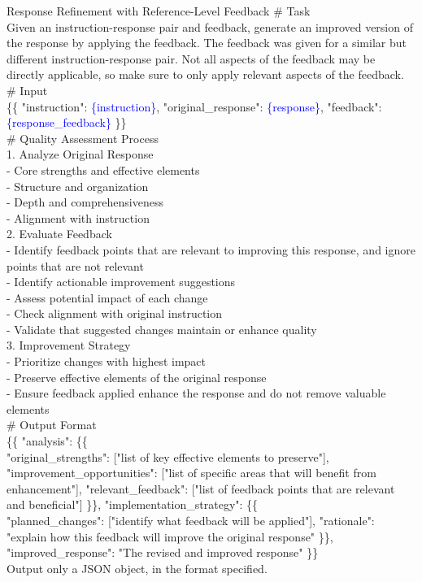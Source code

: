 \begin{promptbox}{Response Refinement with Reference-Level Feedback}
\# Task \\
Given an instruction-response pair and feedback, generate an improved version of the response by applying the feedback. The feedback was given for a similar but different instruction-response pair. Not all aspects of the feedback may be directly applicable, so make sure to only apply relevant aspects of the feedback. \\

\# Input \\
\{\{
  "instruction": \textcolor{blue}{\{instruction\}},
  "original\_response": \textcolor{blue}{\{response\}},
  "feedback": \textcolor{blue}{\{response\_feedback\}}
\}\} \\


\# Quality Assessment Process \\
1. Analyze Original Response \\
- Core strengths and effective elements \\
- Structure and organization \\
- Depth and comprehensiveness \\
- Alignment with instruction \\

2. Evaluate Feedback \\
- Identify feedback points that are relevant to improving this response, and ignore points that are not relevant \\
- Identify actionable improvement suggestions \\
- Assess potential impact of each change \\
- Check alignment with original instruction \\
- Validate that suggested changes maintain or enhance quality \\

3. Improvement Strategy \\
- Prioritize changes with highest impact \\
- Preserve effective elements of the original response \\
- Ensure feedback applied enhance the response and do not remove valuable elements \\

\# Output Format  \\
\{\{
    "analysis": \{\{ \\
        "original\_strengths": ["list of key effective elements to preserve"],
        "improvement\_opportunities": ["list of specific areas that will benefit from enhancement"],
        "relevant\_feedback": ["list of feedback points that are relevant and beneficial"]
    \}\},
    "implementation\_strategy": \{\{ \\
        "planned\_changes": ["identify what feedback will be applied"],
        "rationale": "explain how this feedback will improve the original response"
    \}\},
    "improved\_response": "The revised and improved response"
\}\} \\

Output only a JSON object, in the format specified.
\end{promptbox}

